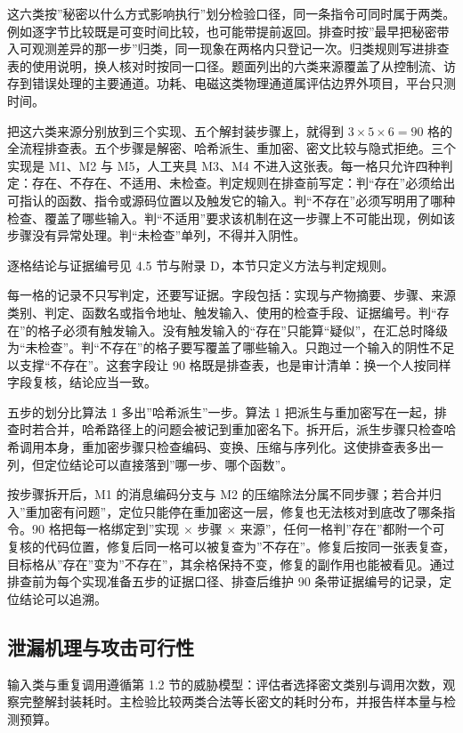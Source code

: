 这六类按”秘密以什么方式影响执行”划分检验口径，同一条指令可同时属于两类。例如逐字节比较既是可变时间比较，也可能带提前返回。排查时按”最早把秘密带入可观测差异的那一步”归类，同一现象在两格内只登记一次。归类规则写进排查表的使用说明，换人核对时按同一口径。题面列出的六类来源覆盖了从控制流、访存到错误处理的主要通道。功耗、电磁这类物理通道属评估边界外项目，平台只测时间。

把这六类来源分别放到三个实现、五个解封装步骤上，就得到 $3\times5\times6=90$ 格的全流程排查表。五个步骤是解密、哈希派生、重加密、密文比较与隐式拒绝。三个实现是 M1、M2 与 M5，人工夹具 M3、M4 不进入这张表。每一格只允许四种判定：存在、不存在、不适用、未检查。判定规则在排查前写定：判“存在”必须给出可指认的函数、指令或源码位置以及触发它的输入。判“不存在”必须写明用了哪种检查、覆盖了哪些输入。判“不适用”要求该机制在这一步骤上不可能出现，例如该步骤没有异常处理。判“未检查”单列，不得并入阴性。

逐格结论与证据编号见 4.5 节与附录 D，本节只定义方法与判定规则。

每一格的记录不只写判定，还要写证据。字段包括：实现与产物摘要、步骤、来源类别、判定、函数名或指令地址、触发输入、使用的检查手段、证据编号。判“存在”的格子必须有触发输入。没有触发输入的“存在”只能算“疑似”，在汇总时降级为“未检查”。判“不存在”的格子要写覆盖了哪些输入。只跑过一个输入的阴性不足以支撑“不存在”。这套字段让 90 格既是排查表，也是审计清单：换一个人按同样字段复核，结论应当一致。

五步的划分比算法 1 多出”哈希派生”一步。算法 1 把派生与重加密写在一起，排查时若合并，哈希路径上的问题会被记到重加密名下。拆开后，派生步骤只检查哈希调用本身，重加密步骤只检查编码、变换、压缩与序列化。这使排查表多出一列，但定位结论可以直接落到”哪一步、哪个函数”。

按步骤拆开后，M1 的消息编码分支与 M2 的压缩除法分属不同步骤；若合并归入”重加密有问题”，定位只能停在重加密这一层，修复也无法核对到底改了哪条指令。90 格把每一格绑定到”实现 × 步骤 × 来源”，任何一格判”存在”都附一个可复核的代码位置，修复后同一格可以被复查为”不存在”。修复后按同一张表复查，目标格从”存在”变为”不存在”，其余格保持不变，修复的副作用也能被看见。通过排查前为每个实现准备五步的证据口径、排查后维护 90 条带证据编号的记录，定位结论可以追溯。

\subsection{泄漏机理与攻击可行性}

输入类与重复调用遵循第 1.2 节的威胁模型：评估者选择密文类别与调用次数，观察完整解封装耗时。主检验比较两类合法等长密文的耗时分布，并报告样本量与检测预算。

